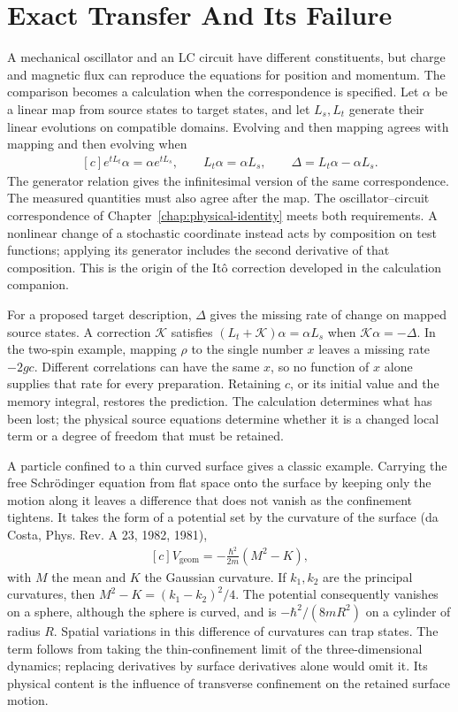 \documentclass[11pt,oneside]{book}
\newenvironment{centeredalign}{\[\begin{gathered}[c]}{\end{gathered}\]}
\begin{document}
\section{Exact Transfer And Its Failure}
A mechanical oscillator and an LC circuit have different constituents,
but charge and magnetic flux can reproduce the equations for position
and momentum. The comparison becomes a calculation when the
correspondence is specified. Let \(\alpha\) be a linear map from source
states to target states, and let \(L_s,L_t\) generate their linear
evolutions on compatible domains. Evolving and then mapping agrees
with mapping and then evolving when
\begin{centeredalign}
e^{tL_t}\alpha=\alpha e^{tL_s},\qquad
L_t\alpha=\alpha L_s,\qquad \Delta=L_t\alpha-\alpha L_s.
\end{centeredalign}
The generator relation gives the infinitesimal version of the same
correspondence. The measured quantities must also agree after the map.
The oscillator--circuit correspondence of
Chapter~\ref{chap:physical-identity} meets both requirements. A nonlinear
change of a stochastic coordinate instead acts by composition on test
functions; applying its generator includes the second derivative of
that composition. This is the origin of the It\^o correction developed
in the calculation companion.

For a proposed target description, \(\Delta\) gives the missing rate
of change on mapped source states. A correction \(\mathcal K\) satisfies
\((L_t+\mathcal K)\alpha=\alpha L_s\) when \(\mathcal K\alpha=-\Delta\).
In the two-spin example, mapping \(\rho\) to the single number
\(x\) leaves a missing rate \(-2gc\). Different correlations
can have the same \(x\), so no function of \(x\) alone supplies
that rate for every preparation. Retaining \(c\), or its initial
value and the memory integral, restores the prediction. The
calculation determines what has been lost; the physical source
equations determine whether it is a changed local term or a
degree of freedom that must be retained.

A particle confined to a thin curved surface gives a classic example. Carrying the free Schr\"odinger equation from
flat space onto the surface by keeping only the motion along it leaves a difference that does not vanish as the
confinement tightens. It takes the form of a potential set by the curvature of the surface (da Costa, Phys. Rev. A 23,
1982, 1981),
\begin{centeredalign}
V_{\mathrm{geom}}=-\frac{\hbar^2}{2m}\left(M^2-K\right),
\end{centeredalign}
with \(M\) the mean and \(K\) the Gaussian curvature. If
\(k_1,k_2\) are the principal curvatures, then
\(M^2-K=(k_1-k_2)^2/4\). The potential consequently vanishes
on a sphere, although the sphere is curved, and is
\(-\hbar^2/(8mR^2)\) on a cylinder of radius \(R\).
Spatial variations in this difference of curvatures can trap
states. The term follows from taking the thin-confinement limit
of the three-dimensional dynamics; replacing derivatives by
surface derivatives alone would omit it. Its physical content
is the influence of transverse confinement on the retained
surface motion.
\end{document}
